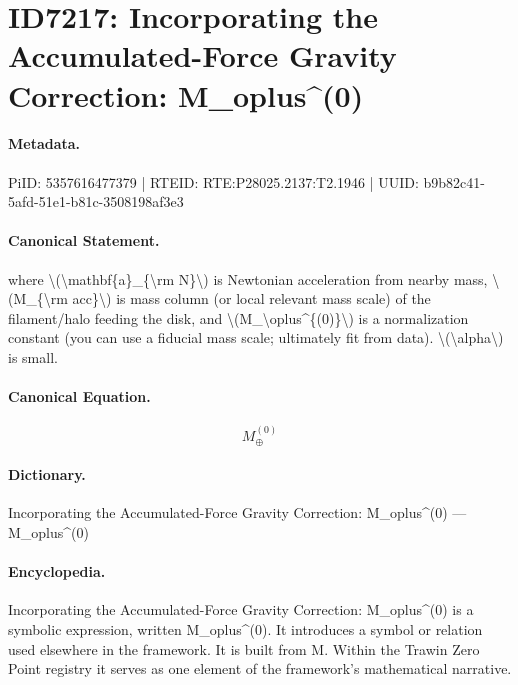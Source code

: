 \section*{ID7217: Incorporating the Accumulated-Force Gravity Correction: M\_oplus\textasciicircum{}(0)}
\paragraph{Metadata.}
PiID: 5357616477379 | RTEID: RTE:P28025.2137:T2.1946 | UUID: b9b82c41-5afd-51e1-b81c-3508198af3e3

\paragraph{Canonical Statement.}
where \textbackslash{}(\textbackslash{}mathbf\{a\}\_\{\textbackslash{}rm N\}\textbackslash{}) is Newtonian acceleration from nearby mass, \textbackslash{}(M\_\{\textbackslash{}rm acc\}\textbackslash{}) is mass column (or local relevant mass scale) of the filament/halo feeding the disk, and \textbackslash{}(M\_\textbackslash{}oplus\textasciicircum{}\{(0)\}\textbackslash{}) is a normalization constant (you can use a fiducial mass scale; ultimately fit from data). \textbackslash{}(\textbackslash{}alpha\textbackslash{}) is small.

\paragraph{Canonical Equation.}
\[
M_\oplus^{(0)}
\]

\paragraph{Dictionary.}
Incorporating the Accumulated-Force Gravity Correction: M\_oplus\textasciicircum{}(0) — M\_oplus\textasciicircum{}(0)

\paragraph{Encyclopedia.}
Incorporating the Accumulated-Force Gravity Correction: M\_oplus\textasciicircum{}(0) is a symbolic expression, written M\_oplus\textasciicircum{}(0). It introduces a symbol or relation used elsewhere in the framework. It is built from M. Within the Trawin Zero Point registry it serves as one element of the framework's mathematical narrative.
